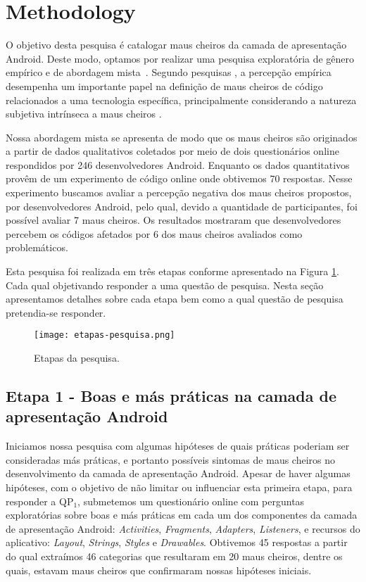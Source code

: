\section{Methodology}

O objetivo desta pesquisa é catalogar maus cheiros da camada de apresentação Android. Deste modo, optamos por realizar uma pesquisa exploratória de gênero empírico e de abordagem mista~\cite{CreswellResearch:13}. Segundo pesquisas \cite{arcoverde2011understanding, Palomba_Do_2014, yamashita2013developers}, a percepção empírica desempenha um importante papel na definição de maus cheiros de código relacionados a uma tecnologia específica, principalmente considerando a natureza subjetiva intrínseca a maus cheiros \cite{JavascriptSmells, JavaQADetectingSmells:02}.

Nossa abordagem mista se apresenta de modo que os maus cheiros são originados a partir de dados qualitativos coletados por meio de dois questionários online respondidos por 246 desenvolvedores Android. Enquanto os dados quantitativos provêm de um experimento de código online onde obtivemos 70 respostas. Nesse experimento buscamos avaliar a percepção negativa dos maus cheiros propostos, por desenvolvedores Android, pelo qual, devido a quantidade de participantes, foi possível avaliar 7 maus cheiros. Os resultados mostraram que desenvolvedores percebem os códigos afetados por 6 dos maus cheiros avaliados como problemáticos.

Esta pesquisa foi realizada em três etapas conforme apresentado na Figura \ref{fig:ResearchPhases}. Cada qual objetivando responder a uma questão de pesquisa. Nesta seção apresentamos detalhes sobre cada etapa bem como a qual questão de pesquisa pretendia-se responder.

\begin{figure}[!htb]
  \centering
  \texttt{[image: etapas-pesquisa.png]}
  \caption{Etapas da pesquisa.}
  \label{fig:ResearchPhases}
\end{figure}

\subsection{Etapa 1 - Boas e más práticas na camada de apresentação Android}
\label{etapa-1}

Iniciamos nossa pesquisa com algumas hipóteses de quais práticas poderiam ser consideradas más práticas, e portanto possíveis sintomas de maus cheiros no desenvolvimento da camada de apresentação Android. Apesar de haver algumas hipóteses, com o objetivo de não limitar ou influenciar esta primeira etapa, para responder a QP$_1$, submetemos um questionário online com perguntas exploratórias sobre boas e más práticas em cada um dos componentes da camada de apresentação Android: \textit{Activities}, \textit{Fragments}, \textit{Adapters}, \textit{Listeners}, e recursos do aplicativo: \textit{Layout}, \textit{Strings}, \textit{Styles} e \textit{Drawables}. Obtivemos 45 respostas a partir do qual extraímos 46 categorias que resultaram em 20 maus cheiros, dentre os quais, estavam maus cheiros que confirmaram nossas hipóteses iniciais.

